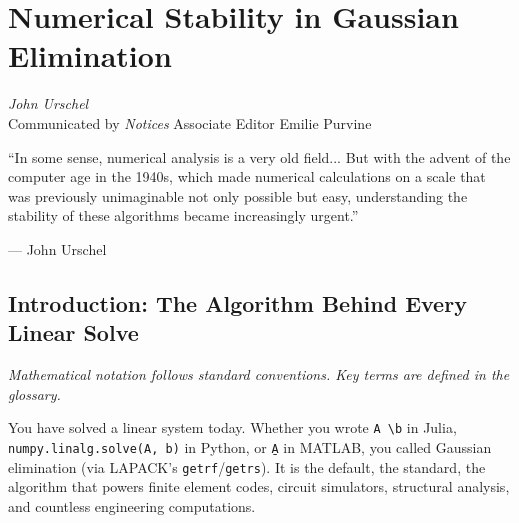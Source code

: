 \chapter{Numerical Stability in Gaussian Elimination}
\label{ch:gaussian}

\begin{flushright}
\textit{John Urschel}\\
Communicated by \textit{Notices} Associate Editor Emilie Purvine
\end{flushright}

\epigraph{``In some sense, numerical analysis is a very old field... But with the advent of the computer age in the 1940s, which made numerical calculations on a scale that was previously unimaginable not only possible but easy, understanding the stability of these algorithms became increasingly urgent.''}{--- John Urschel}

\begin{abstract}
Gaussian elimination is the oldest algorithm in linear algebra, the most popular method for solving linear systems, and the workhorse behind every `A\b' command in MATLAB, Julia, and Python. Yet its numerical stability remained mysterious for decades. This chapter traces the story from von Neumann and Goldstine's 1947 analysis through Wilkinson's breakthrough to modern understanding of growth factors, pivoting strategies, and the surprising fact that partial pivoting---theoretically unstable in worst case---works beautifully in practice, \cite{urschel2025numerical}.
\end{abstract}

\section{Introduction: The Algorithm Behind Every Linear Solve}

\noindent\textit{Mathematical notation follows standard conventions. Key terms are defined in the glossary.}\n
\label{sec:ge:intro}

You have solved a linear system today. Whether you wrote \texttt{A \textbackslash b} in Julia, \texttt{numpy.linalg.solve(A, b)} in Python, or \texttt{A\b} in MATLAB, you called Gaussian elimination (via LAPACK's \texttt{getrf}/\texttt{getrs}). It is the default, the standard, the algorithm that powers finite element codes, circuit simulators, structural analysis, and countless engineering computations.

